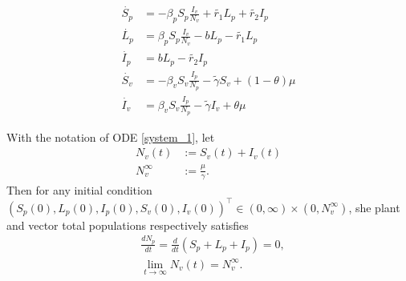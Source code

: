 \begin{equation} 
	\label{system_1} 
	\begin{aligned} 
		\dot{S_p} &= 
			-\beta_p S_p
			\frac{I_v}{N_v} + \tilde{r_1} L_p + \tilde{r_2} I_p  
		\\ 
		\dot{L_p} &= 
			\beta_p S_p
			\frac{I_v}{N_v} - b L_p - \tilde{r_1} L_p  
		\\ 
		\dot{I_p} &= 
			b L_p - \tilde{r_2} I_p  \\ 
		\dot{S_v} &= 
			-\beta_v S_v 
			\frac{I_p}{N_p} - \tilde{\gamma} S_v
			+(1-\theta) \mu  
		\\ 
		\dot{I_v} &= 
			\beta_v S_v \frac{I_p}{N_p} 
			- \tilde{\gamma} I_v
			+ \theta \mu 
	\end{aligned} 
\end{equation} 

\begin{theorem}\label{theorem_1}
	With the notation of ODE \eqref{system_1}, let
	\begin{equation*}
		\begin{aligned}
			N_v(t) &:= S_v(t) + I_v(t) 
		 	\\
		 	N_v^{\infty} &:= \frac{\mu}{\gamma}.
		 \end{aligned}
	\end{equation*}
	Then for any initial condition 
	$
		(S_p(0), L_p(0), I_p(0), S_v(0), I_v(0) )^\top
	 	\in {(0,\infty) \times (0, N^\infty_v)}
	$, she plant and vector total populations respectively satisfies
	\begin{equation*}
		\begin{aligned}
			& \frac{d N_p}{dt} =
				\frac{d}{dt}(S_p + L_p + I_p) = 0,
			\\
			& \lim_{t\to \infty}
				N_v(t) = N_v^{\infty}.
		\end{aligned}
	\end{equation*}
\end{theorem}